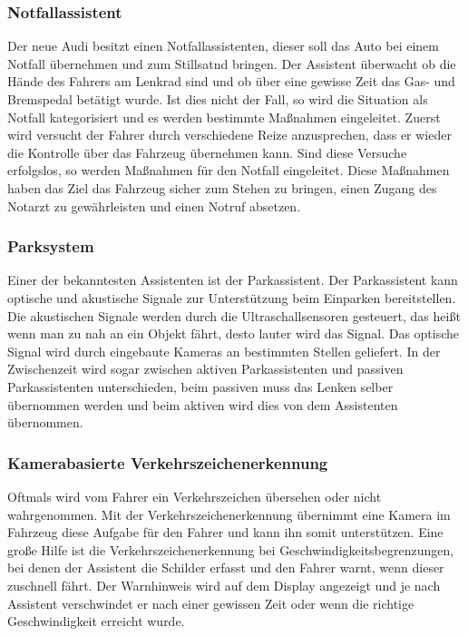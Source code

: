         \subsubsection{Notfallassistent}
        Der neue Audi besitzt einen Notfallassistenten, dieser soll das Auto bei einem Notfall übernehmen 
        und zum Stillsatnd bringen. Der Assistent überwacht ob die Hände des Fahrers am Lenkrad sind und 
        ob über eine gewisse Zeit das Gas- und Bremspedal betätigt wurde. Ist dies nicht der Fall, so 
        wird die Situation als Notfall kategorisiert und es werden bestimmte Maßnahmen eingeleitet.
        Zuerst wird versucht der Fahrer durch verschiedene Reize anzusprechen, dass er wieder die Kontrolle 
        über das Fahrzeug übernehmen kann. Sind diese Versuche erfolgslos, so werden Maßnahmen für den 
        Notfall eingeleitet. Diese Maßnahmen haben das Ziel das Fahrzeug sicher zum Stehen zu bringen, einen Zugang des 
        Notarzt zu gewährleisten und einen Notruf absetzen.
        ~\cite{Audi.PB1}
        
        \subsubsection{Parksystem}
        Einer der bekanntesten Assistenten ist der Parkassistent. Der Parkassistent kann optische und 
        akustische Signale zur Unterstützung beim Einparken bereitstellen. Die akustischen Signale werden
        durch die Ultraschallsensoren gesteuert, das heißt wenn man zu nah an ein Objekt fährt, desto lauter 
        wird das Signal. Das optische Signal wird durch eingebaute Kameras an bestimmten Stellen geliefert.
        In der Zwischenzeit wird sogar zwischen aktiven Parkassistenten und passiven Parkassistenten 
        unterschieden, beim passiven muss das Lenken selber übernommen werden und beim aktiven wird 
        dies von dem Assistenten übernommen.
        ~\cite{parkassi.PB1} ~\cite{assistenzsysteme.PB1} ~\cite{parkassi.PB2}
        
        \subsubsection{Kamerabasierte Verkehrszeichenerkennung}
        Oftmals wird vom Fahrer ein Verkehrszeichen übersehen oder nicht wahrgenommen. Mit der Verkehrszeichenerkennung 
        übernimmt eine Kamera im Fahrzeug diese Aufgabe für den Fahrer und kann ihn somit unterstützen.
        Eine große Hilfe ist die Verkehrszeichenerkennung bei Geschwindigkeitsbegrenzungen, bei denen der 
        Assistent die Schilder erfasst und den Fahrer warnt, wenn dieser zuschnell fährt. Der Warnhinweis 
        wird auf dem Display angezeigt und je nach Assistent verschwindet er nach einer gewissen Zeit oder 
        wenn die richtige Geschwindigkeit erreicht wurde.
        ~\cite{assistenzsysteme.PB1} ~\cite{verkehrszeichenerk.PB1} ~\cite{verkehrszeichenerk.PB2}
        
